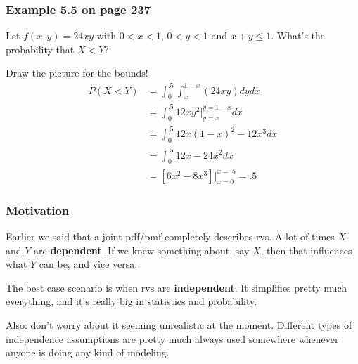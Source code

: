 \documentclass{beamer}
\begin{document}
\begin{frame}
\frametitle{Example 5.5 on page 237}

Let $f(x,y) = 24xy$ with $0 < x < 1$, $0 < y < 1$ and $x+y \le 1$. What's the probability that $X < Y$?
\pause
\newline

Draw the picture for the bounds!
\begin{align*}
P(X < Y) &= \int_{0}^{.5} \int_{x}^{1-x} (24xy) dy dx \\
&= \int_{0}^{.5} 12 x y^2|_{y=x}^{y=1-x} dx \\
&= \int_{0}^{.5} 12 x(1-x)^2  - 12x^3 dx \\
&= \int_{0}^{.5} 12x - 24x^2 dx \\
&= [6x^2 - 8 x^3]|_{x=0}^{x=.5} = .5
\end{align*}

\end{frame}

\begin{frame}
\frametitle{Motivation}

Earlier we said that a joint pdf/pmf completely describes rvs. A lot of times $X$ and $Y$ are \textbf{dependent}. If we knew something about, say $X$, then that influences what $Y$ can be, and vice versa. 
\newline

The best case scenario is when rvs are \textbf{independent}. It simplifies pretty much everything, and it's really big in statistics and probability. 
\newline

Also: don't worry about it seeming unrealistic at the moment. Different types of independence assumptions are pretty much always used somewhere whenever anyone is doing any kind of modeling.

\end{frame}
\end{document}
